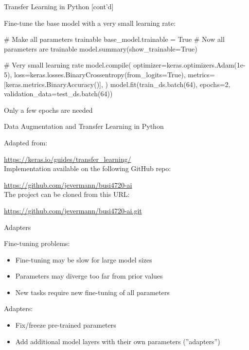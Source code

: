 \documentclass[ignorenonframetext,xcolor=x11names]{beamer}
\begin{document}
\begin{frame}[fragile]{Transfer Learning in Python \small [cont'd]}

Fine-tune the base model with a very small learning rate:
\begin{pythoncode}
# Make all parameters trainable
base_model.trainable = True
# Now all parameters are trainable
model.summary(show_trainable=True)

# Very small learning rate
model.compile(
    optimizer=keras.optimizers.Adam(1e-5),
    loss=keras.losses.BinaryCrossentropy(from_logits=True),
    metrics=[keras.metrics.BinaryAccuracy()],
)
model.fit(train_ds.batch(64), epochs=2, 
          validation_data=test_ds.batch(64))
\end{pythoncode}

\begin{block}{}
Only a few epochs are needed
\end{block}
\end{frame}

\begin{frame}{Data Augmentation and Transfer Learning in Python}

Adapted from: 

\small\url{https://keras.io/guides/transfer_learning/}\normalsize \\

Implementation available on the following GitHub repo:

\small\url{https://github.com/jevermann/busi4720-ai}\normalsize \\

The project can be cloned from this URL:

\small\url{https://github.com/jevermann/busi4720-ai.git}\normalsize
\end{frame}

\begin{frame}{Adapters}

\begin{block}{Fine-tuning problems:}
\begin{itemize}
\item Fine-tuning may be slow for large model sizes
\item Parameters may diverge too far from prior values
\item New tasks require new fine-tuning of all parameters
\end{itemize}
\end{block}

\begin{block}{Adapters:}
\begin{itemize}
\item Fix/freeze pre-trained parameters
\item Add additional model layers with their own parameters (''adapters'')
\end{itemize}
\end{block}
\end{frame}
\end{document}
